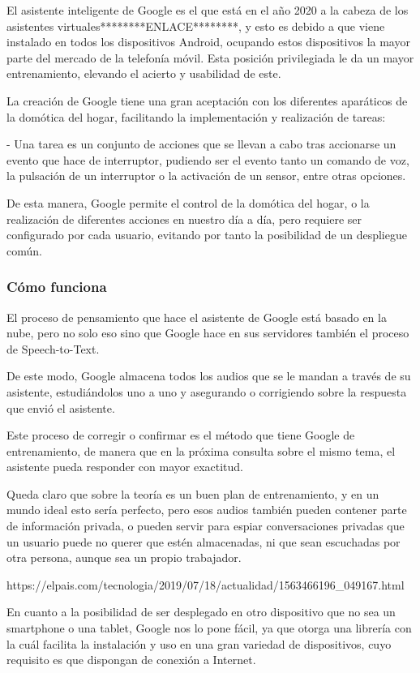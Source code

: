 El asistente inteligente de Google es el que está en el año 2020 a la cabeza de los asistentes virtuales********ENLACE********, y esto es debido a que viene instalado en todos los dispositivos Android, ocupando estos dispositivos la mayor parte del mercado de la telefonía móvil. Esta posición privilegiada le da un mayor entrenamiento, elevando el acierto y usabilidad de este.

La creación de Google tiene una gran aceptación con los diferentes aparáticos de la domótica del hogar, facilitando la implementación y realización de tareas:

- Una tarea es un conjunto de acciones que se llevan a cabo tras accionarse un evento que hace de interruptor, pudiendo ser el evento tanto un comando de voz, la pulsación de un interruptor o la activación de un sensor, entre otras opciones.

De esta manera, Google permite el control de la domótica del hogar, o la realización de diferentes acciones en nuestro día a día, pero requiere ser configurado por cada usuario, evitando por tanto la posibilidad de un despliegue común.

\subsubsection{Cómo funciona}

El proceso de pensamiento que hace el asistente de Google está basado en la nube, pero no solo eso sino que Google hace en sus servidores también el proceso de Speech-to-Text.

De este modo, Google almacena todos los audios que se le mandan a través de su asistente, estudiándolos uno a uno y asegurando o corrigiendo sobre la respuesta que envió el asistente.

Este proceso de corregir o confirmar es el método que tiene Google de entrenamiento, de manera que en la próxima consulta sobre el mismo tema, el asistente pueda responder con mayor exactitud.

Queda claro que sobre la teoría es un buen plan de entrenamiento, y en un mundo ideal esto sería perfecto, pero esos audios también pueden contener parte de información privada, o pueden servir para espiar conversaciones privadas que un usuario puede no querer que estén almacenadas, ni que sean escuchadas por otra persona, aunque sea un propio trabajador.

https://elpais.com/tecnologia/2019/07/18/actualidad/1563466196_049167.html

En cuanto a la posibilidad de ser desplegado en otro dispositivo que no sea un smartphone o una tablet, Google nos lo pone fácil, ya que otorga una librería con la cuál facilita la instalación y uso en una gran variedad de dispositivos, cuyo requisito es que dispongan de conexión a Internet.

